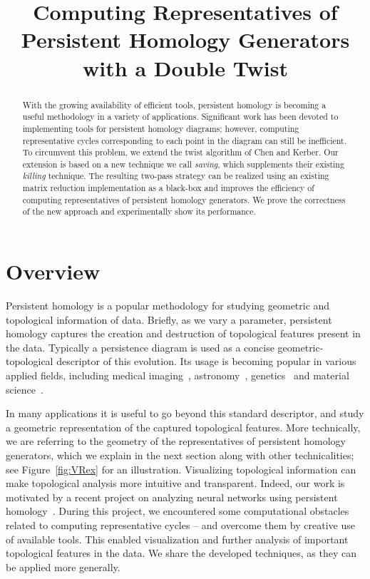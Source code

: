 
\title{Computing Representatives of Persistent Homology Generators with a Double Twist}
\maketitle

\begin{abstract}
With the growing availability of efficient tools, persistent homology is becoming a useful methodology in a variety of applications. Significant work has been devoted to implementing tools for persistent homology diagrams; however, computing representative cycles corresponding to each point in the diagram can still be inefficient. To circumvent this problem, we extend the twist algorithm of Chen and Kerber. Our extension is based on a new technique we call \emph{saving}, which supplements their existing \emph{killing} technique. The resulting two-pass strategy can be realized using an existing matrix reduction implementation as a black-box and improves the efficiency of computing representatives of persistent homology generators. We prove the correctness of the new approach and experimentally show its performance.
\end{abstract}

\section{Overview}
Persistent homology is a popular methodology for studying geometric and topological information of data. Briefly, as we vary a parameter, persistent homology captures the creation and destruction of topological features present in the data. Typically a persistence diagram is used as a concise geometric-topological descriptor of this evolution. Its usage is becoming popular in various applied fields, including medical imaging~\cite{hu2019topology}, astronomy~\cite{heydenreich2021persistent}, genetics~\cite{rabadan2020identification} and material science~\cite{hiraoka2016hierarchical}.

In many applications it is useful to go beyond this standard descriptor, and study a geometric representation of the captured topological features. More technically, we are referring to the geometry of the representatives of persistent homology generators, which we explain in the next section along with other technicalities; see Figure~\ref{fig:VRex} for an illustration. Visualizing topological information can make topological analysis more intuitive and transparent. Indeed, our work is motivated by a recent project on analyzing neural networks using persistent homology~\cite{zheng2021topological}. During this project, we encountered some computational obstacles related to computing representative cycles -- and overcome them by creative use of available tools. This enabled visualization and further analysis of important topological features in the data. We share the developed techniques, as they can be applied more generally.

